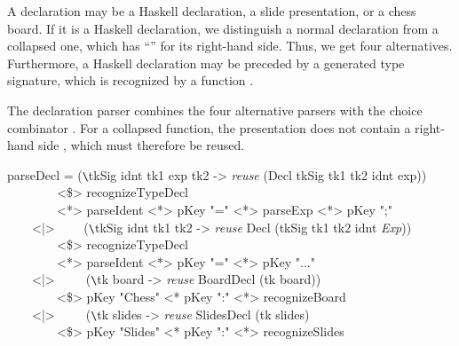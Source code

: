 

A declaration may be a Haskell declaration, a slide presentation, or a chess board. If it is a Haskell declaration, we distinguish a normal declaration from a collapsed one, which has ``'' for its right-hand side. Thus, we get four alternatives. Furthermore, a Haskell declaration may be preceded by a generated type signature, which is recognized by a function .

The declaration parser combines the four alternative parsers with the choice combinator \p{<|>}. For a collapsed function, the presentation does not contain a right-hand side , which must therefore be reused. 

\ttfamily \begin{small} \begin{tabbing}
parseDecl = (\verb|\|tkSig idnt tk1 exp tk2 -> {\em reuse} (Decl tkSig tk1 tk2 idnt exp))\\
~~~~~~~~<\$> recognizeTypeDecl\\
~~~~~~~~<*> parseIdent <*> pKey "=" <*> parseExp <*> pKey ";"\\
~~~~<|>~~~~ (\verb|\|tkSig idnt tk1 tk2 -> {\em reuse} Decl (tkSig tk1 tk2 idnt {\em Exp}))\\
~~~~~~~~<\$> recognizeTypeDecl\\
~~~~~~~~<*> parseIdent <*> pKey "=" <*> pKey "..."\\
~~~~<|>~~~~~(\verb|\|tk board -> {\em reuse} BoardDecl (tk board))\\
~~~~~~~~<\$> pKey "Chess" <* pKey ":" <*> recognizeBoard\\
~~~~<|>~~~~~(\verb|\|tk slides -> {\em reuse} SlidesDecl (tk slides)\\
~~~~~~~~<\$> pKey "Slides" <* pKey ":" <*> recognizeSlides
\end{tabbing} \end{small} \rmfamily
{}



